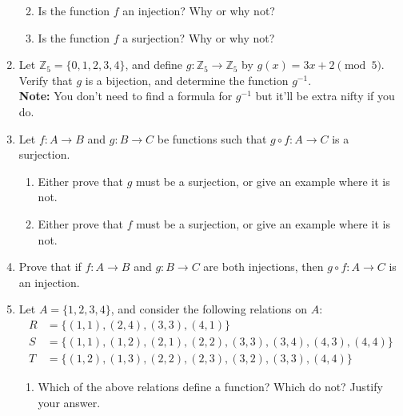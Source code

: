 \documentclass[12pt]{article}
\newcommand{\points}[1]{\marginpar{\hspace{24pt}[#1]}}
\newcommand{\Z}{\mathbb{Z}}
\begin{document}
\begin{enumerate}
\begin{enumerate}
\vspace{1.75in}

 \item Is the function $f$ an injection? Why or why not? \points{2}

\vspace{1in}

 \item Is the function $f$ a surjection? Why or why not?\points{2}

\vspace{1in}

 \end{enumerate}
\item Let $\Z_5 = \{0,1,2,3,4\}$, and define $g:\Z_5\to \Z_5$ by $g(x) = 3x+2 \pmod{5}$.\\
Verify that $g$ is a bijection, and determine the function $g^{-1}$. \points{4}\\
{\bf Note:} You don't need to find a formula for $g^{-1}$ but it'll be extra nifty if you do.

\newpage

\item Let $f:A\to B$ and $g:B\to C$ be functions such that $g\circ f:A\to C$ is a surjection.
\begin{enumerate}
 \item Either prove that $g$ must be a surjection, or give an example where it is not. \points{3}

\vspace{2.5in}

 \item Either prove that $f$ must be a surjection, or give an example where it is not. \points{3}

\vspace{2.5in}

\end{enumerate}
\item Prove that if $f:A\to B$ and $g:B\to C$ are both injections, then $g\circ f:A\to C$ is an injection.\points{4}

\newpage

\item Let $A=\{1,2,3,4\}$, and consider the following relations on $A$:
\begin{align*}
 R &=\{(1,1), (2,4), (3,3), (4,1)\}\\
 S &=\{(1,1), (1,2), (2,1), (2,2), (3,3), (3,4), (4,3), (4,4)\}\\
 T &=\{(1,2), (1,3), (2,2), (2,3), (3,2), (3,3), (4,4)\}
\end{align*}
\begin{enumerate}
 \item Which of the above relations define a function? Which do not? Justify your answer. \points{3}


\end{enumerate}
\end{enumerate}
\end{document}
